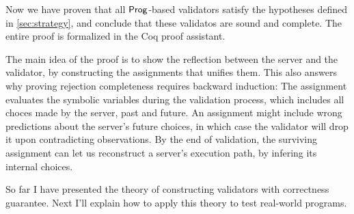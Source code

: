 Now we have proven that all $\mathsf{Prog}$-based validators satisfy the hypotheses
defined in \autoref{sec:strategy}, and conclude that these validatos are sound
and complete.  The entire proof is formalized in the Coq proof assistant.

The main idea of the proof is to show the reflection between the server and the
validator, by constructing the assignments that unifies them.  This also answers
why proving rejection completeness requires backward induction: The assignment
evaluates the symbolic variables during the validation process, which includes
all choces made by the server, past and future.  An assignment might include
wrong predictions about the server's future choices, in which case the validator
will drop it upon contradicting observations.  By the end of validation, the
surviving assignment can let us reconstruct a server's execution path, by
infering its internal choices.

So far I have presented the theory of constructing validators with correctness
guarantee.  Next I'll explain how to apply this theory to test real-world
programs.
